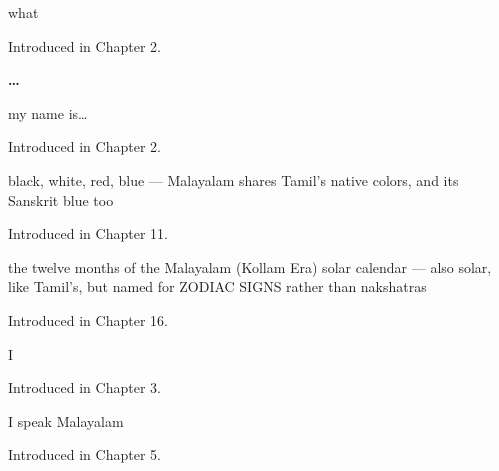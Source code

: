 \noindent\begin{minipage}[t]{\linewidth}
\raggedright
\textbf{}\par
\small what\par
\footnotesize Introduced in Chapter 2.
\end{minipage}\par\medskip

\noindent\begin{minipage}[t]{\linewidth}
\raggedright
\textbf{  … }\par
\small my name is…\par
\footnotesize Introduced in Chapter 2.
\end{minipage}\par\medskip

\noindent\begin{minipage}[t]{\linewidth}
\raggedright
\textbf{   }\par
\small black, white, red, blue — Malayalam shares Tamil's native colors, and its Sanskrit blue too\par
\footnotesize Introduced in Chapter 11.
\end{minipage}\par\medskip

\noindent\begin{minipage}[t]{\linewidth}
\raggedright
\textbf{           }\par
\small the twelve months of the Malayalam (Kollam Era) solar calendar — also solar, like Tamil's, but named for ZODIAC SIGNS rather than nakshatras\par
\footnotesize Introduced in Chapter 16.
\end{minipage}\par\medskip

\noindent\begin{minipage}[t]{\linewidth}
\raggedright
\textbf{}\par
\small I\par
\footnotesize Introduced in Chapter 3.
\end{minipage}\par\medskip

\noindent\begin{minipage}[t]{\linewidth}
\raggedright
\textbf{  }\par
\small I speak Malayalam\par
\footnotesize Introduced in Chapter 5.
\end{minipage}\par\medskip

